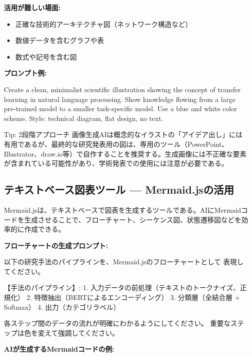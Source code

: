 \textbf{活用が難しい場面:}

\begin{itemize}
\item 正確な技術的アーキテクチャ図（ネットワーク構造など）
\item 数値データを含むグラフや表
\item 数式や記号を含む図
\end{itemize}

\textbf{プロンプト例:}

\begin{promptbox}
Create a clean, minimalist scientific illustration showing the concept
of transfer learning in natural language processing.
Show knowledge flowing from a large pre-trained model to a smaller
task-specific model. Use a blue and white color scheme.
Style: technical diagram, flat design, no text.
\end{promptbox}

\begin{itembox}[l]{Tip: 2段階アプローチ}
画像生成AIは概念的なイラストの「アイデア出し」には有用であるが、最終的な研究発表用の図は、専用のツール（PowerPoint、Illustrator、draw.io等）で自作することを推奨する。生成画像には不正確な要素が含まれている可能性があり、学術発表での使用には注意が必要である。
\end{itembox}

\subsection{テキストベース図表ツール --- Mermaid.jsの活用}

Mermaid.jsは、テキストベースで図表を生成するツールである。AIにMermaidコードを生成させることで、フローチャート、シーケンス図、状態遷移図などを効率的に作成できる。

\textbf{フローチャートの生成プロンプト:}

\begin{promptbox}
以下の研究手法のパイプラインを、Mermaid.jsのフローチャートとして
表現してください。

【手法のパイプライン】:
1. 入力データの前処理（テキストのトークナイズ、正規化）
2. 特徴抽出（BERTによるエンコーディング）
3. 分類層（全結合層 + Softmax）
4. 出力（カテゴリラベル）

各ステップ間のデータの流れが明確にわかるようにしてください。
重要なステップは色を変えて強調してください。
\end{promptbox}

\textbf{AIが生成するMermaidコードの例:}

